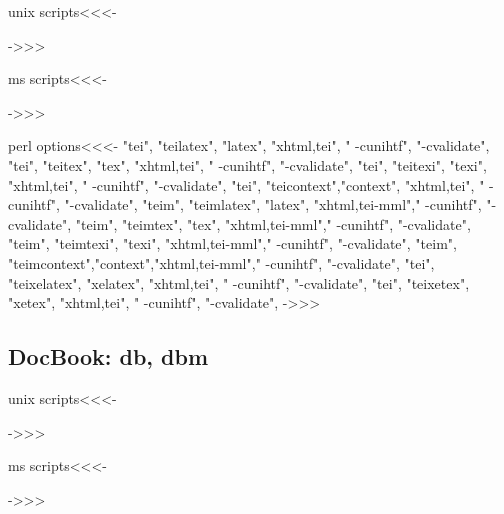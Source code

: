 \documentclass{article}
\begin{document}
\<unix scripts\><<<-

->>>

\<ms scripts\><<<-

->>>


\<perl options\><<<-
 "tei",  "teilatex",  "latex",   "xhtml,tei",    " -cunihtf",  "-cvalidate",
 "tei",  "teitex",    "tex",     "xhtml,tei",    " -cunihtf",  "-cvalidate",
 "tei",  "teitexi",   "texi",    "xhtml,tei",    " -cunihtf",  "-cvalidate",
 "tei",  "teicontext","context", "xhtml,tei",    " -cunihtf",  "-cvalidate",
 "teim", "teimlatex", "latex",   "xhtml,tei-mml"," -cunihtf",  "-cvalidate",
 "teim", "teimtex",   "tex",     "xhtml,tei-mml"," -cunihtf",  "-cvalidate",
 "teim", "teimtexi",  "texi",    "xhtml,tei-mml"," -cunihtf",  "-cvalidate",
 "teim", "teimcontext","context","xhtml,tei-mml"," -cunihtf",  "-cvalidate",
 "tei",  "teixelatex",  "xelatex",   "xhtml,tei",    " -cunihtf",  "-cvalidate",
 "tei",  "teixetex",    "xetex",     "xhtml,tei",    " -cunihtf",  "-cvalidate",
->>>


\subsection{DocBook: db, dbm}

\<unix scripts\><<<-

->>>

\<ms scripts\><<<-

->>>
\end{document}
